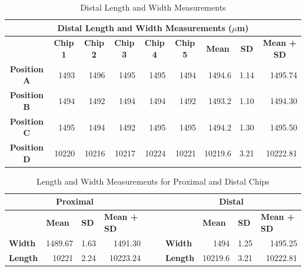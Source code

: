 \documentclass[12pt]{article}
\numberwithin{equation}{section}
\numberwithin{table}{section}
\numberwithin{figure}{section}
\begin{document}
\begin{table}[]
\centering
\caption{Distal Length and Width Measurements }
\label{DLW}
\begin{tabular}{@{}crrrrrrrr@{}}
\toprule
\multicolumn{9}{c}{\textbf{Distal Length and Width Measurements ($\mu$m)}}                                                                                                                                                                                                                                                                                   \\ \midrule
\multicolumn{1}{l}{} & \multicolumn{1}{c}{\textbf{Chip 1}} & \multicolumn{1}{c}{\textbf{Chip 2}} & \multicolumn{1}{c}{\textbf{Chip 3}} & \multicolumn{1}{c}{\textbf{Chip 4}} & \multicolumn{1}{c}{\textbf{Chip 5}} & \multicolumn{1}{c}{\textbf{Mean}} & \multicolumn{1}{c}{\textbf{SD}} & \multicolumn{1}{c}{\textbf{Mean + SD}} \\
\textbf{Position A}  & 1493  & 1496  & 1495  & 1495  & 1494  & 1494.6  & 1.14 & 1495.74  \\
\textbf{Position B}  & 1494  & 1492  & 1494  & 1494  & 1492  & 1493.2  & 1.10 & 1494.30  \\
\textbf{Position C}  & 1495  & 1494  & 1492  & 1495  & 1495  & 1494.2  & 1.30 & 1495.50  \\ 
\textbf{Position D}  & 10220 & 10216 & 10217 & 10224 & 10221 & 10219.6 & 3.21 & 10222.81 \\ \bottomrule
\end{tabular}
\end{table}


\begin{table}[]
\centering
\caption{Length and Width Measurements for Proximal and Distal Chips}
\label{PDLW}
\begin{tabular}{@{}lrrrll|lrrr@{}}
\toprule
\multicolumn{4}{c}{\textbf{Proximal}} & \textbf{} & \textbf{} & \multicolumn{4}{c}{\textbf{Distal}} \\ \midrule
 & \multicolumn{1}{l}{\textbf{Mean}} & \multicolumn{1}{l}{\textbf{SD}} & \multicolumn{1}{l}{\textbf{Mean + SD}} & \textbf{} & \textbf{} &  & \multicolumn{1}{l}{\textbf{Mean}} & \multicolumn{1}{l}{\textbf{SD}} & \multicolumn{1}{l}{\textbf{Mean + SD}} \\
\textbf{Width} & 1489.67 & 1.63 & 1491.30 &  &  & \textbf{Width} & 1494 & 1.25 & 1495.25 \\
\textbf{Length} & 10221 & 2.24 & 10223.24 &  &  & \textbf{Length} & 10219.6 & 3.21 & 10222.81 \\ \bottomrule
\end{tabular}
\end{table}
\end{document}
